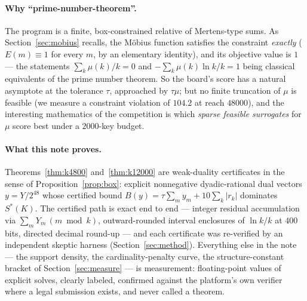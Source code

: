 \documentclass[11pt]{article}
\theoremstyle{remark}
\newcommand{\Sstar}{S^{*}}
\begin{document}
\paragraph{Why ``prime-number-theorem''.} The program is a finite,
box-constrained relative of Mertens-type sums. As Section~\ref{sec:mobius}
recalls, the M\"obius function satisfies the constraint \emph{exactly}
($E(m) \equiv 1$ for every $m$, by an elementary identity), and its
objective value is $1$ --- the statements $\sum_k \mu(k)/k = 0$ and
$-\sum_k \mu(k) \ln k / k = 1$ being classical equivalents of the prime
number theorem. So the board's score has a natural asymptote at the
tolerance $\tau$, approached by $\tau\mu$; but no finite truncation of
$\mu$ is feasible (we measure a constraint violation of $104.2$ at reach
$48000$), and the interesting mathematics of the competition is which
\emph{sparse feasible surrogates} for $\mu$ score best under a $2000$-key
budget.

\paragraph{What this note proves.} Theorems~\ref{thm:k4800}
and~\ref{thm:k12000} are weak-duality certificates in the sense of
Proposition~\ref{prop:box}: explicit nonnegative dyadic-rational dual
vectors $y = Y/2^{48}$ whose certified bound
$B(y) = \tau\sum_m y_m + 10 \sum_k |r_k|$ dominates $\Sstar(K)$. The
certified path is exact end to end --- integer residual accumulation via
$\sum_m Y_m\,(m \bmod k)$, outward-rounded interval enclosures of
$\ln k/k$ at $400$ bits, directed decimal round-up --- and each certificate
was re-verified by an independent skeptic harness
(Section~\ref{sec:method}). Everything else in the note --- the support
density, the cardinality-penalty curve, the structure-constant bracket of
Section~\ref{sec:measure} --- is measurement: floating-point values of
explicit solves, clearly labeled, confirmed against the platform's own
verifier where a legal submission exists, and never called a theorem.
\end{document}
